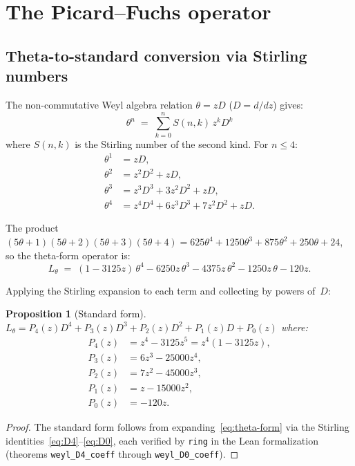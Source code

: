 \documentclass[11pt]{article}
\theoremstyle{plain}
\newtheorem{proposition}[theorem]{Proposition}
\theoremstyle{definition}
\theoremstyle{remark}
\begin{document}
\section{The Picard--Fuchs operator}
\label{sec:pf}

\subsection{Theta-to-standard conversion via Stirling numbers}

The non-commutative Weyl algebra relation $\theta = zD$ ($D = d/dz$) gives:
\[
\theta^n \;=\; \sum_{k=0}^{n} S(n,k)\, z^k D^k
\]
where $S(n,k)$ is the Stirling number of the second kind. For $n \leq 4$:
\begin{align*}
\theta^1 &= zD, \\
\theta^2 &= z^2 D^2 + zD, \\
\theta^3 &= z^3 D^3 + 3z^2 D^2 + zD, \\
\theta^4 &= z^4 D^4 + 6z^3 D^3 + 7z^2 D^2 + zD.
\end{align*}

The product $(5\theta+1)(5\theta+2)(5\theta+3)(5\theta+4) = 625\theta^4 + 1250\theta^3 + 875\theta^2 + 250\theta + 24$, so the theta-form operator is:
\begin{equation}\label{eq:theta-form}
L_\theta \;=\; (1-3125z)\,\theta^4 - 6250z\,\theta^3 - 4375z\,\theta^2 - 1250z\,\theta - 120z.
\end{equation}

Applying the Stirling expansion to each term and collecting by powers of~$D$:

\begin{proposition}[Standard form]\label{prop:standard-form}
$L_\theta = P_4(z)D^4 + P_3(z)D^3 + P_2(z)D^2 + P_1(z)D + P_0(z)$ where:
\begin{align*}
P_4(z) &= z^4 - 3125z^5 = z^4(1 - 3125z), \\
P_3(z) &= 6z^3 - 25000z^4, \\
P_2(z) &= 7z^2 - 45000z^3, \\
P_1(z) &= z - 15000z^2, \\
P_0(z) &= -120z.
\end{align*}
\end{proposition}

\begin{proof}
The standard form follows from expanding~\eqref{eq:theta-form} via the Stirling identities~\eqref{eq:D4}--\eqref{eq:D0}, each verified by \texttt{ring} in the Lean formalization (theorems \texttt{weyl\_D4\_coeff} through \texttt{weyl\_D0\_coeff}).
\end{proof}
\end{document}
